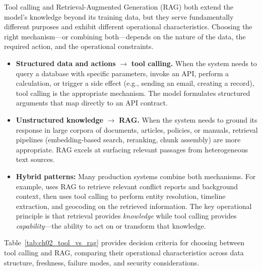 Tool calling and Retrieval-Augmented Generation (RAG) both extend the model's knowledge beyond its training data, but they serve fundamentally different purposes and exhibit different operational characteristics. Choosing the right mechanism---or combining both---depends on the nature of the data, the required action, and the operational constraints.

\begin{itemize}
  \item \textbf{Structured data and actions} $\rightarrow$ \textbf{tool calling.} When the system needs to query a database with specific parameters, invoke an API, perform a calculation, or trigger a side effect (e.g., sending an email, creating a record), tool calling is the appropriate mechanism. The model formulates structured arguments that map directly to an API contract.

  \item \textbf{Unstructured knowledge} $\rightarrow$ \textbf{RAG.} When the system needs to ground its response in large corpora of documents, articles, policies, or manuals, retrieval pipelines (embedding-based search, reranking, chunk assembly) are more appropriate. RAG excels at surfacing relevant passages from heterogeneous text sources.

  \item \textbf{Hybrid patterns:} Many production systems combine both mechanisms. For example, \ishtar{} uses RAG to retrieve relevant conflict reports and background context, then uses tool calling to perform entity resolution, timeline extraction, and geocoding on the retrieved information. The key operational principle is that retrieval provides \emph{knowledge} while tool calling provides \emph{capability}---the ability to act on or transform that knowledge.
\end{itemize}

Table~\ref{tab:ch02_tool_vs_rag} provides decision criteria for choosing between tool calling and RAG, comparing their operational characteristics across data structure, freshness, failure modes, and security considerations.

